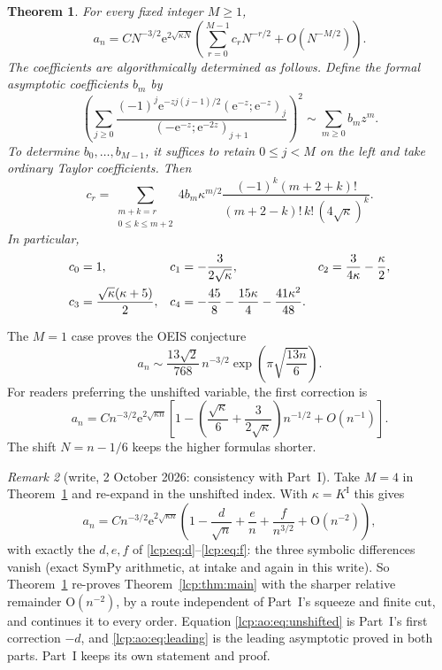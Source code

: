 \documentclass[11pt]{article}
\numberwithin{equation}{section}
\newtheorem{theorem}{Theorem}[section]
\theoremstyle{definition}\newtheorem{definition}[theorem]{Definition}
\theoremstyle{remark}\newtheorem{remark}[theorem]{Remark}
\newcommand{\OO}{\mathrm O}
\newcommand{\ee}{\mathrm e}
\begin{document}
\begin{theorem}\label{lcp:ao:thm:main}
For every fixed integer $M\ge1$,
\begin{equation}\label{lcp:ao:eq:allorders}
 a_n=C N^{-3/2}\ee^{2\sqrt{\kappa N}}
 \left(\sum_{r=0}^{M-1}c_r N^{-r/2}+O(N^{-M/2})\right).
\end{equation}
The coefficients are algorithmically determined as follows. Define the formal asymptotic coefficients $b_m$ by
\begin{equation}\label{lcp:ao:eq:bdef}
 \left(\sum_{j\ge0}\frac{(-1)^j\ee^{-zj(j-1)/2}(\ee^{-z};\ee^{-z})_j}
 {(-\ee^{-z};\ee^{-2z})_{j+1}}\right)^2
 \sim\sum_{m\ge0}b_m z^m.
\end{equation}
To determine $b_0,\ldots,b_{M-1}$, it suffices to retain $0\le j<M$ on the left and take ordinary Taylor coefficients. Then
\begin{equation}\label{lcp:ao:eq:cr}
 c_r=\sum_{\substack{m+k=r\\0\le k\le m+2}}
 4b_m\kappa^{m/2}\frac{(-1)^k(m+2+k)!}
 {(m+2-k)!\,k!\,(4\sqrt\kappa)^k}.
\end{equation}
In particular,
\begin{align}\label{lcp:ao:eq:firstc}
 c_0&=1,&c_1&=-\frac{3}{2\sqrt\kappa},&
 c_2&=\frac{3}{4\kappa}-\frac\kappa2,\notag\\
 c_3&=\frac{\sqrt\kappa(\kappa+5)}2,&
 c_4&=-\frac{45}{8}-\frac{15\kappa}{4}-\frac{41\kappa^2}{48}.
\end{align}
\end{theorem}
The $M=1$ case proves the OEIS conjecture
\begin{equation}\label{lcp:ao:eq:leading}
 a_n\sim \frac{13\sqrt2}{768}\,n^{-3/2}\exp\!\left(\pi\sqrt{\frac{13n}{6}}\right).
\end{equation}
For readers preferring the unshifted variable, the first correction is
\begin{equation}\label{lcp:ao:eq:unshifted}
 a_n=Cn^{-3/2}\ee^{2\sqrt{\kappa n}}
 \left[1-\left(\frac{\sqrt\kappa}{6}+\frac{3}{2\sqrt\kappa}\right)n^{-1/2}
 +O(n^{-1})\right].
\end{equation}
The shift $N=n-1/6$ keeps the higher formulas shorter.

\begin{remark}[write, 2 October 2026: consistency with Part~I]\label{lcp:ao:rem:partI}
Take $M=4$ in Theorem~\ref{lcp:ao:thm:main} and re-expand in the unshifted
index. With $\kappa=K^{\mathrm I}$ this gives
\[
 a_n=Cn^{-3/2}\ee^{2\sqrt{\kappa n}}
 \left(1-\frac d{\sqrt n}+\frac en+\frac f{n^{3/2}}+\OO(n^{-2})\right),
\]
with exactly the $d,e,f$ of \eqref{lcp:eq:d}--\eqref{lcp:eq:f}: the three
symbolic differences vanish (exact SymPy arithmetic, at intake and again in
this write). So Theorem~\ref{lcp:ao:thm:main} re-proves
Theorem~\ref{lcp:thm:main} with the sharper relative remainder
$\OO(n^{-2})$, by a route independent of Part~I's squeeze and finite cut,
and continues it to every order. Equation \eqref{lcp:ao:eq:unshifted} is
Part~I's first correction $-d$, and \eqref{lcp:ao:eq:leading} is the
leading asymptotic proved in both parts. Part~I keeps its own statement
and proof.
\end{remark}
\end{document}
